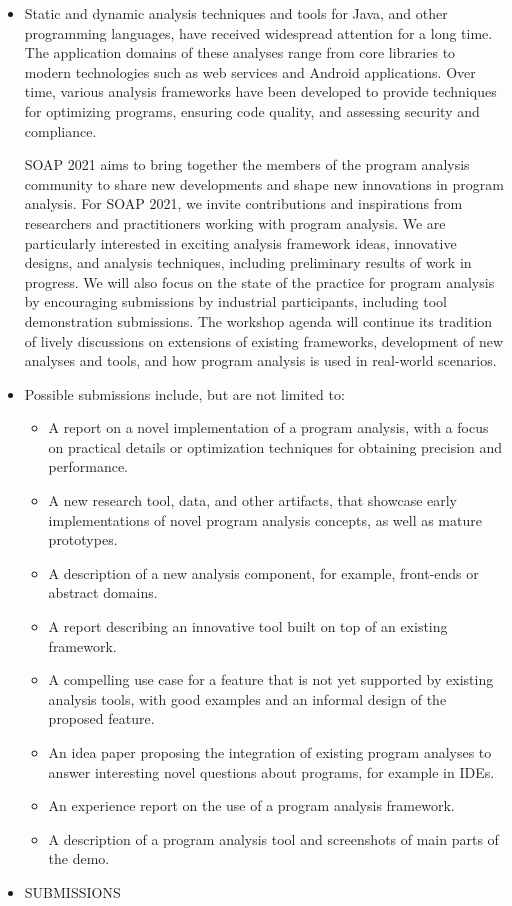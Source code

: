 \documentclass{article}
\begin{document}
\begin{itemize}\item  Static and dynamic analysis techniques and tools for Java, and other programming languages, have received widespread attention for a long time. The application domains of these analyses range from core libraries to modern technologies such as web services and Android applications. Over time, various analysis frameworks have been developed to provide techniques for optimizing programs, ensuring code quality, and assessing security and compliance. 
 
  SOAP 2021 aims to bring together the members of the program analysis community to share new developments and shape new innovations in program analysis. For SOAP 2021, we invite contributions and inspirations from researchers and practitioners working with program analysis. We are particularly interested in exciting analysis framework ideas, innovative designs, and analysis techniques, including preliminary results of work in progress. We will also focus on the state of the practice for program analysis by encouraging submissions by industrial participants, including tool demonstration submissions. The workshop agenda will continue its tradition of lively discussions on extensions of existing frameworks, development of new analyses and tools, and how program analysis is used in real-world scenarios. 
 
\item  Possible submissions include, but are not limited to: 
 
\begin{itemize}\item  A report on a novel implementation of a program analysis, with a focus on practical details or optimization techniques for obtaining precision and performance.
\item  A new research tool, data, and other artifacts, that showcase early implementations of novel program analysis concepts, as well as mature prototypes.
\item  A description of a new analysis component, for example, front-ends or abstract domains.
\item  A report describing an innovative tool built on top of an existing framework.
\item  A compelling use case for a feature that is not yet supported by existing analysis tools, with good examples and an informal design of the proposed feature.
\item  An idea paper proposing the integration of existing program analyses to answer interesting novel questions about programs, for example in IDEs.
\item  An experience report on the use of a program analysis framework.
\item  A description of a program analysis tool and screenshots of main parts of the demo.
\end{itemize} 
\item  SUBMISSIONS  
 

\end{itemize}
\end{document}
